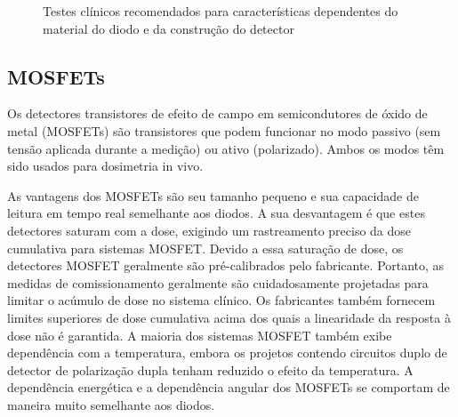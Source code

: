 \documentclass[11pt,a4paper]{article}
\begin{document}
	\begin{figure}[h]
		\centering
		\caption{Testes clínicos recomendados para características dependentes do material do diodo e da construção do detector}
		\label{fig:testesDiodo}
	\end{figure}

\subsection*{MOSFETs}

	Os detectores transistores de efeito de campo em semicondutores de óxido de metal (MOSFETs) são transistores que podem funcionar no modo passivo (sem tensão aplicada durante a medição) ou ativo (polarizado). Ambos os modos têm sido usados para dosimetria in vivo.
	
	As vantagens dos MOSFETs são seu tamanho pequeno e sua capacidade de leitura em tempo real semelhante aos diodos. A sua desvantagem é que estes detectores saturam com a dose, exigindo um rastreamento preciso da dose cumulativa para sistemas MOSFET. Devido a essa saturação de dose, os detectores MOSFET geralmente são pré-calibrados pelo fabricante. Portanto, as medidas de comissionamento geralmente são cuidadosamente projetadas para limitar o acúmulo de dose no sistema clínico. Os fabricantes também fornecem limites superiores de dose cumulativa acima dos quais a linearidade da resposta à dose não é garantida. A maioria dos sistemas MOSFET também exibe dependência com a temperatura, embora os projetos contendo  circuitos duplo de detector de polarização dupla tenham reduzido o efeito da temperatura. A dependência energética e a dependência angular dos MOSFETs se comportam de maneira muito semelhante aos diodos.
\end{document}
